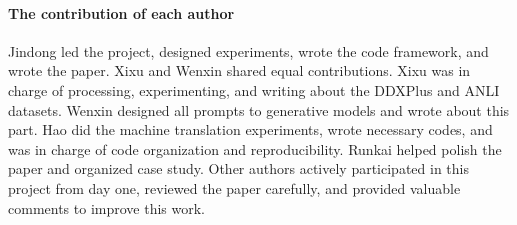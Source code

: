 \documentclass[11pt]{article}
\newcommand{\chat}{ChatGPT\xspace}
\newcommand{\ddx}{DDXPlus\xspace}
\begin{document}

\paragraph{The contribution of each author}
Jindong led the project, designed experiments, wrote the code framework, and wrote the paper.
Xixu and Wenxin shared equal contributions.
Xixu was in charge of processing, experimenting, and writing about the \ddx and ANLI datasets.
Wenxin designed all prompts to generative models and wrote about this part.
Hao did the machine translation experiments, wrote necessary codes, and was in charge of code organization and reproducibility.
Runkai helped polish the paper and organized case study.
Other authors actively participated in this project from day one, reviewed the paper carefully, and provided valuable comments to improve this work.





\end{document}
